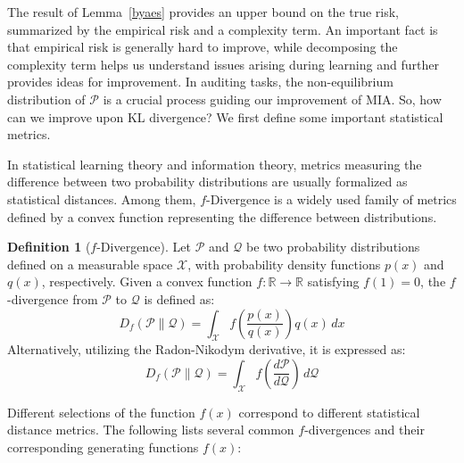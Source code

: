 \documentclass{article}
\theoremstyle{plain}
\theoremstyle{definition}
\newtheorem{definition}[theorem]{Definition}
\theoremstyle{remark}
\begin{document}
The result of Lemma~\ref{byaes} provides an upper bound on the true risk, summarized by the empirical risk and a complexity term. An important fact is that empirical risk is generally hard to improve, while decomposing the complexity term helps us understand issues arising during learning and further provides ideas for improvement. In auditing tasks, the non-equilibrium distribution of $\mathcal{P}$ is a crucial process guiding our improvement of MIA. So, how can we improve upon KL divergence? We first define some important statistical metrics.

In statistical learning theory and information theory, metrics measuring the difference between two probability distributions are usually formalized as statistical distances. Among them, $f$-Divergence is a widely used family of metrics defined by a convex function representing the difference between distributions.

\begin{definition}[$f$-Divergence]
Let $\mathcal{P}$ and $\mathcal{Q}$ be two probability distributions defined on a measurable space $\mathcal{X}$, with probability density functions $p(x)$ and $q(x)$, respectively. Given a convex function $f: \mathbb{R} \to \mathbb{R}$ satisfying $f(1)=0$, the $f$-divergence from $\mathcal{P}$ to $\mathcal{Q}$ is defined as:
\begin{equation}
    D_f(\mathcal{P}\|\mathcal{Q}) = \int_{\mathcal{X}} f\left(\frac{p(x)}{q(x)}\right) q(x) \, dx
\end{equation}
Alternatively, utilizing the Radon-Nikodym derivative, it is expressed as:
\begin{equation}
    D_f(\mathcal{P}\|\mathcal{Q}) = \int_{\mathcal{X}} f\left(\frac{d\mathcal{P}}{d\mathcal{Q}}\right) \, d\mathcal{Q}
\end{equation}
\end{definition}

Different selections of the function $f(x)$ correspond to different statistical distance metrics. The following lists several common $f$-divergences and their corresponding generating functions $f(x)$:
\end{document}
